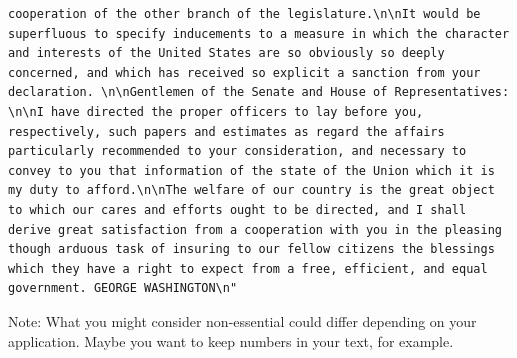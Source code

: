 \documentclass[
  letterpaper,
  DIV=11,
  numbers=noendperiod]{scrreprt}
\newenvironment{Shaded}{\begin{snugshade}}{\end{snugshade}}
\newcommand{\AttributeTok}[1]{\textcolor[rgb]{0.40,0.45,0.13}{#1}}
\newcommand{\CommentTok}[1]{\textcolor[rgb]{0.37,0.37,0.37}{#1}}
\newcommand{\DocumentationTok}[1]{\textcolor[rgb]{0.37,0.37,0.37}{\textit{#1}}}
\newcommand{\FunctionTok}[1]{\textcolor[rgb]{0.28,0.35,0.67}{#1}}
\newcommand{\NormalTok}[1]{\textcolor[rgb]{0.00,0.23,0.31}{#1}}
\newcommand{\OtherTok}[1]{\textcolor[rgb]{0.00,0.23,0.31}{#1}}
\newcommand{\SpecialCharTok}[1]{\textcolor[rgb]{0.37,0.37,0.37}{#1}}
\newcommand{\StringTok}[1]{\textcolor[rgb]{0.13,0.47,0.30}{#1}}
\begin{document}
\begin{verbatim}
cooperation of the other branch of the legislature.\n\nIt would be superfluous to specify inducements to a measure in which the character and interests of the United States are so obviously so deeply concerned, and which has received so explicit a sanction from your declaration. \n\nGentlemen of the Senate and House of Representatives: \n\nI have directed the proper officers to lay before you, respectively, such papers and estimates as regard the affairs particularly recommended to your consideration, and necessary to convey to you that information of the state of the Union which it is my duty to afford.\n\nThe welfare of our country is the great object to which our cares and efforts ought to be directed, and I shall derive great satisfaction from a cooperation with you in the pleasing though arduous task of insuring to our fellow citizens the blessings which they have a right to expect from a free, efficient, and equal government. GEORGE WASHINGTON\n"
\end{verbatim}

\begin{Shaded}
\end{Shaded}

Note: What you might consider non-essential could differ depending on
your application. Maybe you want to keep numbers in your text, for
example.
\end{document}
